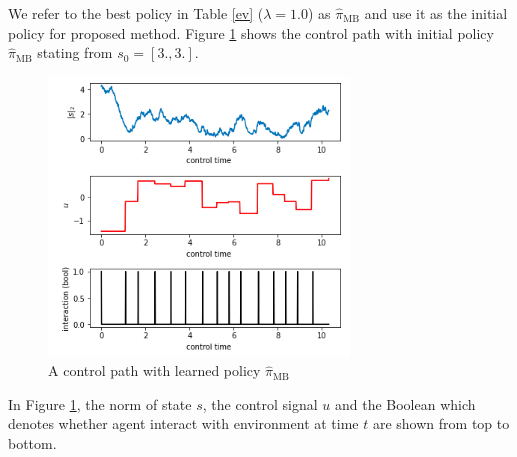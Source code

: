 \documentclass[english, dvipdfmx]{ampmt}             %
\begin{document}
We refer to the best policy in Table \ref{ev} ($\lambda = 1.0$) as $\hat{\pi}_{\textrm{MB}}$ and use it as the initial policy for proposed method. Figure \ref{naiive} shows the control path with initial policy $\hat{\pi}_{\textrm{MB}}$ stating from $s_0 = [3., 3.]$.
\begin{figure}[H]
	\centering
 	\includegraphics[width=8cm]{naiive.png}
 	\caption{A control path with learned policy $\hat{\pi}_{\textrm{MB}}$} \label{naiive}
\end{figure}
In Figure \ref{naiive}, the norm of state $s$, the control signal $u$ and the Boolean which denotes whether agent interact with environment at time $t$ are shown from top to bottom.
\end{document}
